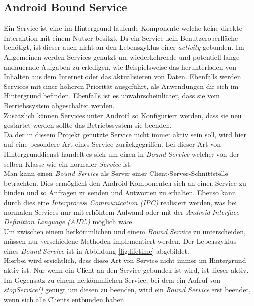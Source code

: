 \documentclass[]{report}
\begin{document}
\subsection{Android Bound Service}
Ein Service ist eine im Hintergrund laufende Komponente welche keine direkte Interaktion mit einem Nutzer besitzt. Da ein Service kein Benutzeroberfläche benötigt, ist dieser auch nicht an den Lebenszyklus einer \textit{activity} gebunden. Im Allgemeinen werden Services genutzt um wiederkehrende und potentiell lange andauernde Aufgaben zu erledigen, wie Beispielsweise das herunterladen von Inhalten aus dem Internet oder das aktualisieren von Daten. Ebenfalls werden Services mit einer höheren Priorität ausgeführt, als Anwendungen die sich im Hintergrund befinden. Ebenfalls ist es unwahrscheinlicher, dass sie vom Betriebssystem abgeschaltet werden. \\
Zusätzlich können Services unter Android so Konfiguriert werden, dass sie neu gestartet werden sollte das Betriebssystem sie beenden. \\
Da der in diesem Projekt genutzte Service nicht immer aktiv sein soll, wird hier auf eine besondere Art eines Service zurückgegriffen. Bei dieser Art von Hintergrunddienst handelt es sich um einen in \textit{Bound Service} welcher von der selben Klasse wie ein normaler \textit{Service} ist. \\
Man kann einen \textit{Bound Service} als Server einer Client-Server-Schnittstelle betrachten. Dies ermöglicht den Android Komponenten sich an einen Service zu binden und so Anfragen zu senden und Antworten zu erhalten. Ebenso kann durch dies eine \textit{Interprocess Communication (IPC)} realisiert werden, was bei normalen Services nur mit erhöhtem Aufwand oder mit der \textit{Android Interface Definition Language (AIDL)} möglich wäre. \\
Um zwischen einem herkömmlichen und einem \textit{Bound Service} zu unterscheiden, müssen nur verschiedene Methoden implementiert werden. Der Lebenszyklus eines \textit{Bound Service} ist in Abbildung \ref{fig:lifetime} abgebildet. \\
Hierbei wird ersichtlich, dass diese Art von Service nicht immer im Hintergrund aktiv ist. Nur wenn ein Client an den Service gebunden ist wird, ist dieser aktiv. Im Gegensatz zu einem herkömmlichen Service, bei dem ein Aufruf von \textit{stopService()} genügt um diesen zu beenden, wird ein \textit{Bound Service} erst beendet, wenn sich alle Clients entbunden haben.
\end{document}
